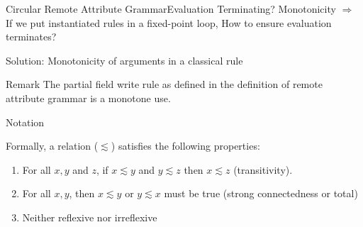 


\begin{frame}{Circular Remote Attribute Grammar}{Evaluation Terminating? Monotonicity}
$\Rightarrow$ If we put instantiated rules in a fixed-point loop, How to \alert{ensure evaluation terminates}?

\newlinevspace

Solution: \alert{Monotonicity} of arguments in a classical rule

\newlinevspace

\begin{block}{Remark}
The partial field write rule as defined in the definition of remote attribute grammar is a \alert{monotone} use.
\end{block}
\end{frame}




\begin{frame}{Notation}{\Customorder{}}

Formally, a \customorder{} relation ($\lesssim$) satisfies the following properties:

\begin{enumerate}
    \item For all $x,y$ and $z$, if $x\lesssim y$ and $y\lesssim z$ then $x\lesssim z$ (\alert{transitivity}).
    \item For all $x, y$, then $x\lesssim y$ or $y\lesssim x$ must be true (strong connectedness or \alert{total})
    \item Neither reflexive nor irreflexive
\end{enumerate}

\end{frame}




